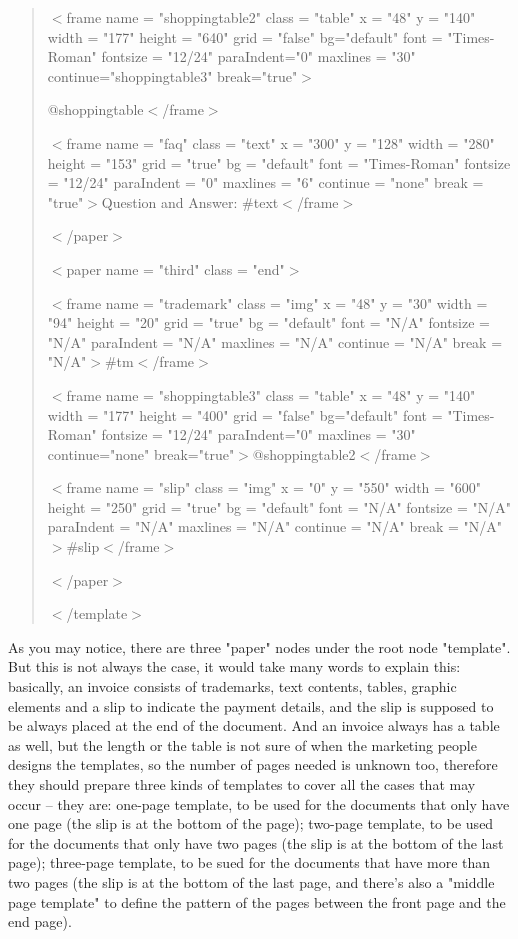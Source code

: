 \documentclass{report}
\begin{document}
\begin{quote}
  $<$frame name = "shoppingtable2" class = "table" x = "48" y = "140" width = "177" height = "640" grid = "false" bg="default" font = "Times-Roman" fontsize = "12/24" paraIndent="0" maxlines = "30" continue="shoppingtable3" break="true"$>$

@shoppingtable$<$/frame$>$

  $<$frame name = "faq" class = "text" x = "300" y = "128" width = "280" height = "153" grid = "true" bg = "default" font = "Times-Roman" fontsize = "12/24" paraIndent = "0" maxlines = "6" continue = "none" break = "true"$>$Question and Answer: \#text$<$/frame$>$

$<$/paper$>$

$<$paper name = "third" class = "end"$>$
  
  $<$frame name = "trademark" class = "img" x = "48" y = "30" width = "94" height = "20" grid = "true" bg = "default" font = "N/A" fontsize = "N/A" paraIndent = "N/A" maxlines = "N/A" continue = "N/A" break = "N/A"$>$\#tm$<$/frame$>$

  $<$frame name = "shoppingtable3" class = "table" x = "48" y = "140" width = "177" height = "400" grid = "false" bg="default" font = "Times-Roman" fontsize = "12/24" paraIndent="0" maxlines = "30" continue="none" break="true"$>$@shoppingtable2$<$/frame$>$

  $<$frame name = "slip" class = "img" x = "0" y = "550" width = "600" height = "250" grid = "true" bg = "default" font = "N/A" fontsize = "N/A" paraIndent = "N/A" maxlines = "N/A" continue = "N/A" break = "N/A"$>$\#slip$<$/frame$>$

$<$/paper$>$

$<$/template$>$ 

\end{quote}

  As you may notice, there are three "paper" nodes under the root node "template". But this is not always the case, it would take many words to explain this: basically, an invoice consists of trademarks, text contents, tables, graphic elements and a slip to indicate the payment details, and the slip is supposed to be always placed at the end of the document. And an invoice always has a table as well, but the length or the table is not sure of when the marketing people designs the templates, so the number of pages needed is unknown too, therefore they should prepare three kinds of templates to cover all the cases that may occur -- they are: one-page template, to be used for the documents that only have one page (the slip is at the bottom of the page); two-page template, to be used for the documents that only have two pages (the slip is at the bottom of the last page); three-page template, to be sued for the documents that have more than two pages (the slip is at the bottom of the last page, and there's also a "middle page template" to define the pattern of the pages between the front page and the end page). 
\end{document}
